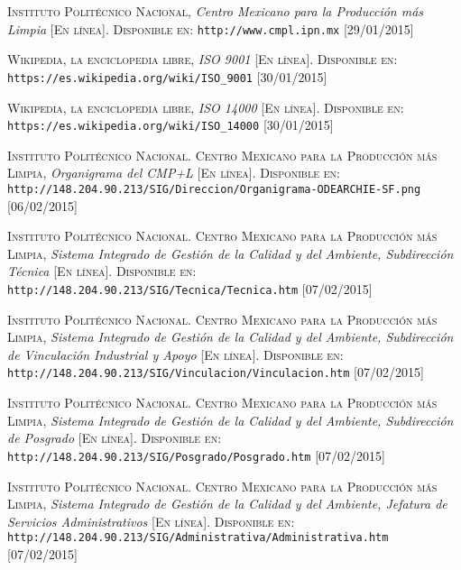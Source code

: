\begin{thebibliography}{X}
		\textsc{Instituto Politécnico Nacional},
		\textit{Centro Mexicano para la Producción más Limpia}
		\textsc{[En línea]. Disponible en:}
		\texttt{http://www.cmpl.ipn.mx}
		\textsc{[29/01/2015]}
		
		\textsc{Wikipedia, la enciclopedia libre},
		\textit{ISO 9001}
		\textsc{[En línea]. Disponible en:}
		\texttt{https://es.wikipedia.org/wiki/ISO\_9001}
		\textsc{[30/01/2015]}
		
		\textsc{Wikipedia, la enciclopedia libre},
		\textit{ISO 14000}
		\textsc{[En línea]. Disponible en:}
		\texttt{https://es.wikipedia.org/wiki/ISO\_14000}
		\textsc{[30/01/2015]}
		
		\textsc{Instituto Politécnico Nacional. Centro Mexicano para la Producción más Limpia},
		\textit{Organigrama del CMP+L}
		\textsc{[En línea]. Disponible en:}
		\texttt{http://148.204.90.213/SIG/Direccion/Organigrama-ODEARCHIE-SF.png}
		\textsc{[06/02/2015]}
		
		\textsc{Instituto Politécnico Nacional. Centro Mexicano para la Producción más Limpia},
		\textit{Sistema Integrado de Gestión de la Calidad y del Ambiente, Subdirección Técnica}
		\textsc{[En línea]. Disponible en:}
		\texttt{http://148.204.90.213/SIG/Tecnica/Tecnica.htm}
		\textsc{[07/02/2015]}
	
		\textsc{Instituto Politécnico Nacional. Centro Mexicano para la Producción más Limpia},
		\textit{Sistema Integrado de Gestión de la Calidad y del Ambiente, Subdirección de Vinculación Industrial y Apoyo}
		\textsc{[En línea]. Disponible en:}
		\texttt{http://148.204.90.213/SIG/Vinculacion/Vinculacion.htm}
		\textsc{[07/02/2015]}
		
		\textsc{Instituto Politécnico Nacional. Centro Mexicano para la Producción más Limpia},
		\textit{Sistema Integrado de Gestión de la Calidad y del Ambiente, Subdirección de Posgrado}
		\textsc{[En línea]. Disponible en:}
		\texttt{http://148.204.90.213/SIG/Posgrado/Posgrado.htm}
		\textsc{[07/02/2015]}
		
		\textsc{Instituto Politécnico Nacional. Centro Mexicano para la Producción más Limpia},
		\textit{Sistema Integrado de Gestión de la Calidad y del Ambiente, Jefatura de Servicios Administrativos}
		\textsc{[En línea]. Disponible en:}
		\texttt{http://148.204.90.213/SIG/Administrativa/Administrativa.htm}
		\textsc{[07/02/2015]}
		

\end{thebibliography}
